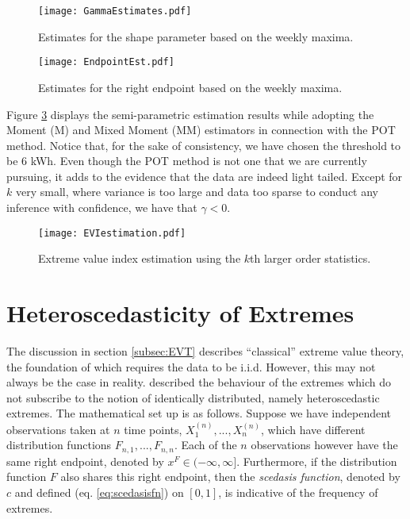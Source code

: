 \begin{figure}
\begin{center}
\texttt{[image: GammaEstimates.pdf]}
\caption{Estimates for the shape parameter based on the weekly maxima.} \label{fig:gammaEst}
\end{center}
\end{figure}

\begin{figure}
\begin{center}
\texttt{[image: EndpointEst.pdf]}
\caption{Estimates for the right endpoint based on the weekly maxima.} \label{fig:EndPointEst}
\end{center}
\end{figure}

Figure \ref{fig:POTEst} displays the semi-parametric estimation results while adopting the Moment (M) and Mixed Moment (MM) estimators in connection with the POT method. Notice that, for the sake of consistency, we have chosen the threshold to be 6 kWh. Even though the POT method is not one that we are currently pursuing, it adds to the evidence that the data are indeed light tailed. Except for $k$ very small, where variance is too large and data too sparse to conduct any inference with confidence, we have that $\gamma < 0$.

\begin{figure}
\begin{center}
\texttt{[image: EVIestimation.pdf]}
\caption{Extreme value index estimation using the $k$th larger order statistics.} \label{fig:POTEst}
\end{center}
\end{figure}

\section{Heteroscedasticity of Extremes} \label{subsec:sced}

The discussion in section \ref{subsec:EVT} describes ``classical'' extreme value theory, the foundation of which requires the data to be i.i.d. However, this may not always be the case in reality. \cite{einmahl16} described the behaviour of the extremes which do not subscribe to the notion of identically distributed, namely heteroscedastic extremes. The mathematical set up is as follows. Suppose we have independent observations taken at $n$ time points, $X_1^{(n)} , ... , X_n^{(n)}$, which have different distribution functions $F_{n,1}, ... , F_{n,n}$. Each of the $n$ observations however have the same right endpoint, denoted by $x^F \in (-\infty, \infty]$. Furthermore, if the distribution function $F$ also shares this right endpoint, then the \textit{scedasis function}, denoted by $c$ and defined (eq. \ref{eq:scedasisfn}) on $[0,1]$, is indicative of the frequency of extremes.

